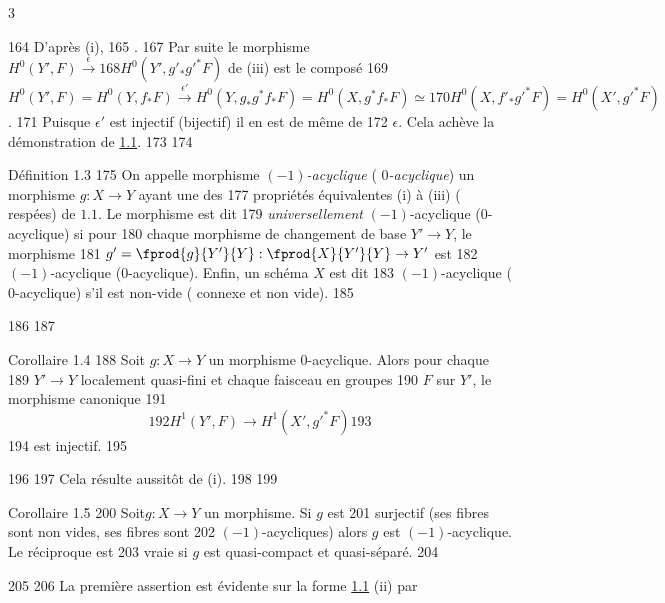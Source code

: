 3	\documentclass[10pt]{../fichiers-configuration-latex/smfart}
\begin{document}
   164	D'après (i),
   165	.
   167	Par suite le morphisme $H^{0}(Y',F)\xrightarrow{\epsilon}
   168	H^{0}(Y',g'_{\ast}{g'}^{\ast}F)$ de (iii) est le composé
   169	$H^{0}(Y',F)=H^{0}(Y,f_{\ast}F)\xrightarrow{\epsilon'}H^{0}(Y,g_{\ast}g^{\ast}f_{\ast}F)=H^{0}(X,g^{\ast}f_{\ast}F)\simeq
   170	H^{0}(X,{f'}_{\ast}{g'}^{\ast}F)=H^{0}(X',{g'}^{\ast}F)$.
   171	Puisque $\epsilon'$ est injectif (\resp bijectif) il en est de même de
   172	$\epsilon$. Cela achève la démonstration de \hyperref[XV.prop1.1]{1.1}.
   173	
   174	\begin{enonce*}{Définition 1.3}
   175	On appelle morphisme \emph{$(-1)$-acyclique} (	\emph{$0$-acyclique}) un morphisme $g:X\rightarrow Y$ ayant une des
   177	propriétés équivalentes {\rm (i)} à {\rm (iii)} ( respées) de $1.1$. Le morphisme est dit
   179	\emph{universellement} $(-1)$-acyclique (\resp $0$-acyclique) si pour
   180	chaque morphisme de changement de base $Y'\rightarrow Y$, le morphisme
   181	$g'=\fprod{g}{Y'}{Y}:\fprod{X}{Y'}{Y}\rightarrow Y'$ est
   182	$(-1)$-acyclique (\resp $0$-acyclique). Enfin, un schéma $X$ est dit
   183	$(-1)$-acyclique (\resp $0$-acyclique) s'il est non-vide (	connexe et non vide).
   185	\end{enonce*}
   186	
   187	\begin{enonce*}{Corollaire 1.4}
   188	Soit $g:X\rightarrow Y$ un morphisme $0$-acyclique. Alors pour chaque
   189	$Y'\rightarrow Y$ localement quasi-fini et chaque faisceau en groupes
   190	$F$ sur $Y'$, le morphisme canonique
   191	$$
   192	H^{1}(Y',F)\longrightarrow H^{1}(X',{g'}^{\ast}F)
   193	$$
   194	est injectif.
   195	\end{enonce*}
   196	
   197	Cela résulte aussitôt de  (i).
   198	
   199	\begin{enonce*}{Corollaire 1.5}
   200	Soit\pageoriginale $g:X\rightarrow Y$ un morphisme. Si $g$ est
   201	surjectif (\ie ses fibres sont non vides, \ie ses fibres sont
   202	$(-1)$-acycliques) alors $g$ est $(-1)$-acyclique. Le réciproque est
   203	vraie si $g$ est quasi-compact et quasi-séparé.
   204	\end{enonce*}
   205	
   206	La première assertion est évidente sur la forme \hyperref[XV.prop1.1]{1.1} (ii) par
\end{document}
